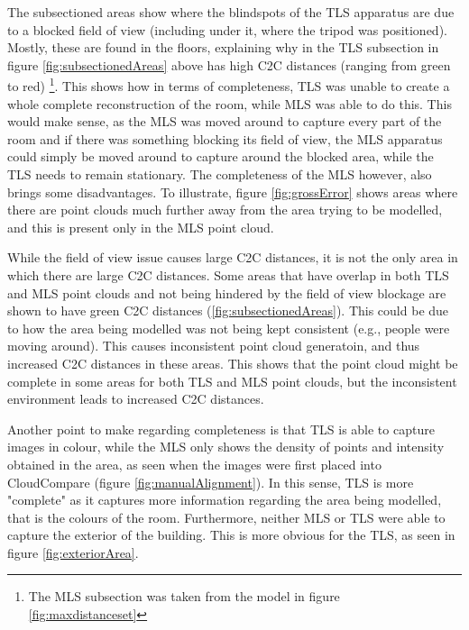 \documentclass[man]{apa7}
\begin{document}
The subsectioned areas show where the blindspots of the TLS apparatus are due to a blocked field of view (including under it, where the tripod was positioned). Mostly, these are found in the floors, explaining why in the TLS subsection in figure \ref{fig:subsectionedAreas} above has high C2C distances (ranging from green to red) \footnote{The MLS subsection was taken from the model in figure \ref{fig:maxdistanceset}}. This shows how in terms of completeness, TLS was unable to create a whole complete reconstruction of the room, while MLS was able to do this. This would make sense, as the MLS was moved around to capture every part of the room and if there was something blocking its field of view, the MLS apparatus could simply be moved around to capture around the blocked area, while the TLS needs to remain stationary. The completeness of the MLS however, also brings some disadvantages. To illustrate, figure \ref{fig:grossError} shows areas where there are point clouds much further away from the area trying to be modelled, and this is present only in the MLS point cloud.

While the field of view issue causes large C2C distances, it is not the only area in which there are large C2C distances. Some areas that have overlap in both TLS and MLS point clouds and not being hindered by the field of view blockage are shown to have green C2C distances (\ref{fig:subsectionedAreas}). This could be due to how the area being modelled was not being kept consistent (e.g., people were moving around). This causes inconsistent point cloud generatoin, and thus increased C2C distances in these areas. This shows that the point cloud might be complete in some areas for both TLS and MLS point clouds, but the inconsistent environment leads to increased C2C distances.

Another point to make regarding completeness is that TLS is able to capture images in colour, while the MLS only shows the density of points and intensity obtained in the area, as seen when the images were first placed into CloudCompare (figure \ref{fig:manualAlignment}). In this sense, TLS is more "complete" as it captures more information regarding the area being modelled, that is the colours of the room. Furthermore, neither MLS or TLS were able to capture the exterior of the building. This is more obvious for the TLS, as seen in figure \ref{fig:exteriorArea}.
\end{document}
